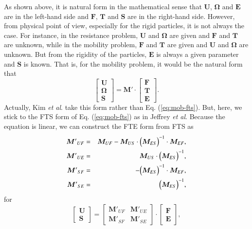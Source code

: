 \documentclass{book}
\begin{document}
As shown above, it is natural form in the mathematical sense
that $\bm{U}$, $\bm{\Omega}$ and $\bm{E}$ are in the left-hand side
and $\bm{F}$, $\bm{T}$ and $\bm{S}$ are in the right-hand side.
However, from physical point of view, especially for the rigid particles,
it is not always the case.
For instance, in the resistance problem,
$\bm{U}$ and $\bm{\Omega}$ are given and
$\bm{F}$ and $\bm{T}$ are unknown,
while in the mobility problem,
$\bm{F}$ and $\bm{T}$ are given and
$\bm{U}$ and $\bm{\Omega}$ are unknown.
But from the rigidity of the particles,
$\bm{E}$ is always a given parameter and
$\bm{S}$ is known.
That is, for the mobility problem, it would be the natural form that
\begin{equation}
  \left[
    \begin{array}{c}
      \bm{U}\\
      \bm{\Omega}\\
      \bm{S}
    \end{array}
  \right]
  =
  \bm{M}'
  \cdot
  \left[
    \begin{array}{c}
      \bm{F}\\
      \bm{T}\\
      \bm{E}
    \end{array}
  \right]
  .
\end{equation}
Actually, Kim {\it et al}. take this form
rather than Eq. (\ref{eq:mob-fts}).
But, here, we stick to the FTS form of Eq. (\ref{eq:mob-fts})
as in Jeffrey {\it et al}.
Because the equation is linear,
we can construct the FTE form from FTS as
\begin{eqnarray}
  {\bm{M}'}_{UF}
  &=&
  \bm{M}_{UF}
  -
  \bm{M}_{US}
  \cdot
  \Bigl(
  \bm{M}_{ES}
  \Bigr)^{-1}
  \cdot
  \bm{M}_{EF}
  ,\\
  {\bm{M}'}_{UE}
  &=&
  \bm{M}_{US}
  \cdot
  \Bigl(
    \bm{M}_{ES}
  \Bigr)^{-1}
  ,\\
  {\bm{M}'}_{SF}
  &=&
  -
  \Bigl(
    \bm{M}_{ES}
  \Bigr)^{-1}
  \cdot
  \bm{M}_{EF}
  ,\\
  {\bm{M}'}_{SE}
  &=&
  \Bigl(
    \bm{M}_{ES}
  \Bigr)^{-1}
  ,
\end{eqnarray}
for
\begin{equation}
  \left[
    \begin{array}{c}
      \bm{U}\\
      \bm{S}
    \end{array}
  \right]
  =
  \left[
    \begin{array}{cc}
      {\bm{M}'}_{UF} & {\bm{M}'}_{UE}\\
      {\bm{M}'}_{SF} & {\bm{M}'}_{SE}
    \end{array}
  \right]
  \cdot
  \left[
    \begin{array}{c}
      \bm{F}\\
      \bm{E}
    \end{array}
  \right]
  ,
\end{equation}
\end{document}
